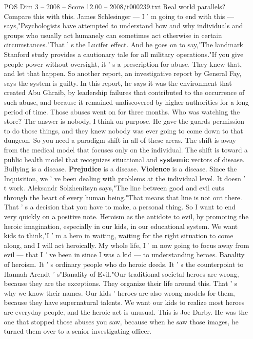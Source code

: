 \begin{textsample}{POS Dim 3 – 2008 – Score 12.00 – 2008/t000239.txt}
Real world parallels?
Compare this with this.
James Schlesinger — I ' m going to end with this — says,"Psychologists have attempted to understand how and why individuals and groups who usually act humanely can sometimes act otherwise in certain circumstances."That ' s the Lucifer effect.
And he goes on to say,"The landmark Stanford study provides a cautionary tale for all military operations."If you give people power without oversight, it ' s a prescription for abuse.
They knew that, and let that happen.
So another report, an investigative report by General Fay, says the system is guilty.
In this report, he says it was the environment that created Abu Ghraib, by leadership failures that contributed to the occurrence of such abuse, and because it remained undiscovered by higher authorities for a long period of time.
Those abuses went on for three months.
Who was watching the store?
The answer is nobody, I think on purpose.
He gave the guards permission to do those things, and they knew nobody was ever going to come down to that dungeon.
So you need a paradigm shift in all of these areas.
The shift is away from the medical model that focuses only on the individual.
The shift is toward a public health model that recognizes situational and \textbf{systemic} vectors of disease.
Bullying is a disease. \textbf{Prejudice} is a disease. \textbf{Violence} is a disease.
Since the Inquisition, we ' ve been dealing with problems at the individual level.
It doesn ' t work.
Aleksandr Solzhenitsyn says,"The line between good and evil cuts through the heart of every human being."That means that line is not out there.
That ' s a decision that you have to make, a personal thing.
So I want to end very quickly on a positive note.
Heroism as the antidote to evil, by promoting the heroic imagination, especially in our kids, in our educational system.
We want kids to think,"I ' m a hero in waiting, waiting for the right situation to come along, and I will act heroically.
My whole life, I ' m now going to focus away from evil — that I ' ve been in since I was a kid — to understanding heroes.
Banality of heroism.
It ' s ordinary people who do heroic deeds.
It ' s the counterpoint to Hannah Arendt ' s"Banality of Evil."Our traditional societal heroes are wrong, because they are the exceptions.
They organize their life around this.
That ' s why we know their names.
Our kids ' heroes are also wrong models for them, because they have supernatural talents.
We want our kids to realize most heroes are everyday people, and the heroic act is unusual.
This is Joe Darby.
He was the one that stopped those abuses you saw, because when he saw those images, he turned them over to a senior investigating officer.

\end{textsample}
